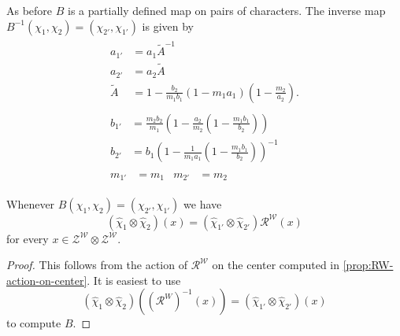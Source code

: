 \documentclass{sl2ams}
\numberwithin{equation}{section}
\newcommand{\Z}{\mathcal{Z}}
\newcommand{\W}{\mathcal{W}}
\newcommand{\R}{\mathcal{R}}
\begin{document}
As before \(B\) is a partially defined map on pairs of characters.
The inverse map \(B^{-1}(\chi_1, \chi_2) = (\chi_{2'}, \chi_{1'})\) is given by
\begin{gather}
  \label{eq:a-transf-negative}
  \begin{aligned}
    a_{1'}
      &=
      a_1 \tilde A^{-1}
      \\
      a_{2'}
      &=
      a_2 \tilde A
      \\
      \tilde A
      &=
      1 - \frac{b_2}{m_1 b_1}\left(1 - m_1 a_1 \right)\left(1 - \frac{m_2}{a_2}\right).
  \end{aligned}
  \\
  \label{eq:b-transf-negative}
  \begin{aligned}
    b_{1'}
      &=
      \frac{m_2 b_2}{m_1}
      \left(
        1 - \frac{a_2}{m_2} \left( 1 - \frac{m_1 b_1}{b_2} \right)
      \right)
      \\
      b_{2'}
      &=
      b_1
      \left(
        1 - \frac{1}{m_1 a_1} \left( 1 - \frac{m_1 b_1}{b_2} \right)
      \right)^{-1}
  \end{aligned}
  \\
  \label{eq:m-transf-negative}
  \begin{aligned}
    m_{1'}
      &= m_1
      &
      m_{2'}
      &= m_2
  \end{aligned}
\end{gather}

\begin{proposition}
  \label{thm:braiding formulas}
  Whenever \(B(\chi_1, \chi_2) = (\chi_{2'}, \chi_{1'})\) we have
  \[
    (\hat \chi_1 \otimes \hat \chi_2)(x) = (\hat \chi_{1'} \otimes \hat \chi_{2'})\R^\W(x)
  \]
  for every \(x \in \Z^\W \otimes \Z^\W\).
\end{proposition}
\begin{proof}
  This follows from the action of \(\R^\W\) on the center computed in \cref{prop:RW-action-on-center}.
  It is easiest to use
  \[
    (\hat \chi_1 \otimes \hat \chi_2)\left((\R^W)^{-1}(x)\right) = (\hat \chi_{1'} \otimes \hat \chi_{2'})(x)
  \]
  to compute \(B\).
\end{proof}
\end{document}
